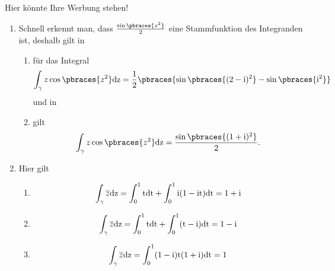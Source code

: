 \begin{solution}
    Hier könnte Ihre Werbung stehen!
    \begin{enumerate}[label = (\roman*)]
        \item Schnell erkennt man, dass $\frac{\sin\pbraces{z^2}}{2}$ eine Stammfunktion des Integranden ist, deshalb gilt in
        \begin{enumerate}[label = (\arabic*)]
            \item für das Integral
            \begin{align*}
                \int_\gamma z \cos\pbraces{z^2} \rm{d}z = \frac{1}{2}\pbraces{\sin\pbraces{(2 - \rm{i})^2} - \sin\pbraces{i^2}}
            \end{align*}
            und in 
            \item gilt
            \begin{align*}
                \int_\gamma z \cos\pbraces{z^2} \rm{d}z = \frac{\sin\pbraces{(1 + i)^2}}{2}.
            \end{align*}
        \end{enumerate}
        \item Hier gilt
        \begin{enumerate}[label = (\alph*)]
            \item 
            \begin{align*}
                \int_\gamma \overline{z} \rm{d}z = \int_0^1 t \rm{d}t +  \int_0^1 \rm{i}(1 - \rm{i}t) \rm{d}t = 1 + \rm{i}
            \end{align*}
            \item 
            \begin{align*}
                \int_\gamma \overline{z} \rm{d}z = \int_0^1 t \rm{d}t + \int_0^1 (t - \rm{i}) \rm{d}t = 1 - \rm{i}
            \end{align*}
            \item 
            \begin{align*}
                \int_\gamma \overline{z} \rm{d}z = \int_0^1 (1 - \rm{i})t(1 + \rm{i}) \rm{d}t = 1
            \end{align*}
        \end{enumerate}
    \end{enumerate}
    
\end{solution}